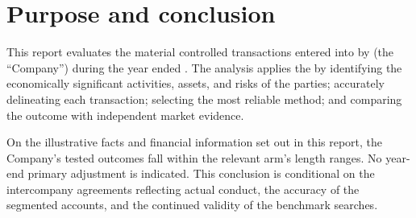 \section{Purpose and conclusion}
This report evaluates the material controlled transactions entered into by
\EntityName{} (the ``Company'') during the year ended \FiscalYearEnd. The
analysis applies the \ALP{} by identifying the economically significant
activities, assets, and risks of the parties; accurately delineating each
transaction; selecting the most reliable method; and comparing the outcome with
independent market evidence.

On the illustrative facts and financial information set out in this report, the
Company's tested outcomes fall within the relevant arm's length ranges. No
year-end primary adjustment is indicated. This conclusion is conditional on the
intercompany agreements reflecting actual conduct, the accuracy of the
segmented accounts, and the continued validity of the benchmark searches.
